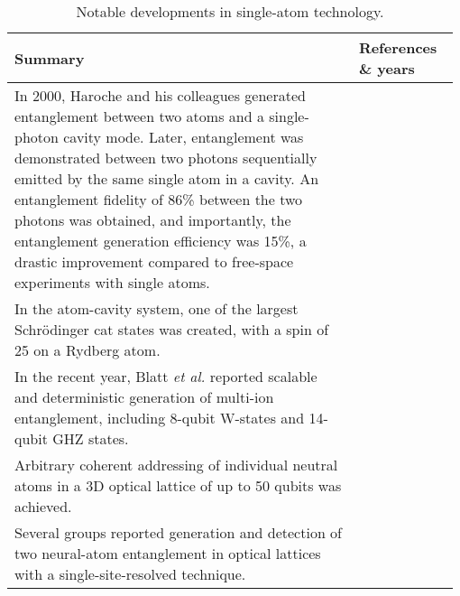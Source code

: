 \begin{table*}[!htbp]
	\begin{tabular}{|p{0.755\linewidth}|p{0.22\linewidth}|}
		\hline
	\textbf{Summary} & \textbf{References \& years} \\	\hline \hline
		In 2000, Haroche and his colleagues generated entanglement between two atoms and a single-photon cavity mode. Later, entanglement was demonstrated between two photons sequentially emitted by the same single atom in a cavity. An entanglement fidelity of 86\% between the two photons was obtained, and importantly, the entanglement generation efficiency was 15\%, a drastic improvement compared to free-space experiments with single atoms. & \cite{bib:rauschenbeutel2000step, bib:wilk2007single, bib:blinov2004observation} \\
		\hline
		In the atom-cavity system, one of the largest Schr{\"o}dinger cat states was created, with a spin of 25 on a Rydberg atom. & \cite{bib:facon2016sensitive} \\
		\hline
		In the recent year, Blatt \textit{et al.} reported scalable and deterministic generation of multi-ion entanglement, including 8-qubit W-states and 14-qubit GHZ states. & \cite{bib:haffner2005scalable, bib:monz2011}\\
		\hline
		Arbitrary coherent addressing of individual neutral atoms in a 3D optical lattice of up to 50 qubits was achieved. & \cite{bib:wang2015coherent} \\
		\hline		
		Several groups reported generation and detection of two neural-atom entanglement in optical lattices with a single-site-resolved technique. & \cite{bib:kaufman2015entangling, bib:islam2015measuring, bib:dai2016generation}\\
		\hline
	\end{tabular}
	\captionspacetab \caption{Notable developments in single-atom technology.} \label{tab:single_atoms}
\end{table*}


